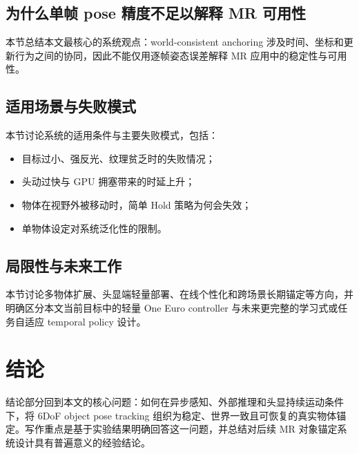 \documentclass[review]{vgtc}
\begin{document}
\subsection{为什么单帧 pose 精度不足以解释 MR 可用性}
本节总结本文最核心的系统观点：world-consistent anchoring 涉及时间、坐标和更新行为之间的协同，因此不能仅用逐帧姿态误差解释 MR 应用中的稳定性与可用性。

\subsection{适用场景与失败模式}
本节讨论系统的适用条件与主要失败模式，包括：
\begin{itemize}
  \item 目标过小、强反光、纹理贫乏时的失败情况；
  \item 头动过快与 GPU 拥塞带来的时延上升；
  \item 物体在视野外被移动时，简单 Hold 策略为何会失效；
  \item 单物体设定对系统泛化性的限制。
\end{itemize}

\subsection{局限性与未来工作}
本节讨论多物体扩展、头显端轻量部署、在线个性化和跨场景长期锚定等方向，并明确区分本文当前目标中的轻量 One Euro controller 与未来更完整的学习式或任务自适应 temporal policy 设计。

\section{结论}
结论部分回到本文的核心问题：如何在异步感知、外部推理和头显持续运动条件下，将 6DoF object pose tracking 组织为稳定、世界一致且可恢复的真实物体锚定。写作重点是基于实验结果明确回答这一问题，并总结对后续 MR 对象锚定系统设计具有普遍意义的经验结论。


\nocite{*}


\end{document}
